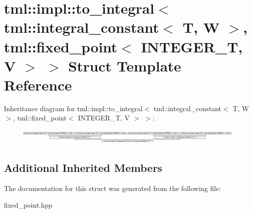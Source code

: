 \hypertarget{structtml_1_1impl_1_1to__integral_3_01tml_1_1integral__constant_3_01T_00_01W_01_4_00_01tml_1_1fi02608aa1375cbbb359f453a97b0813b7}{\section{tml\+:\+:impl\+:\+:to\+\_\+integral$<$ tml\+:\+:integral\+\_\+constant$<$ T, W $>$, tml\+:\+:fixed\+\_\+point$<$ I\+N\+T\+E\+G\+E\+R\+\_\+\+T, V $>$ $>$ Struct Template Reference}
\label{structtml_1_1impl_1_1to__integral_3_01tml_1_1integral__constant_3_01T_00_01W_01_4_00_01tml_1_1fi02608aa1375cbbb359f453a97b0813b7}
}
Inheritance diagram for tml\+:\+:impl\+:\+:to\+\_\+integral$<$ tml\+:\+:integral\+\_\+constant$<$ T, W $>$, tml\+:\+:fixed\+\_\+point$<$ I\+N\+T\+E\+G\+E\+R\+\_\+\+T, V $>$ $>$\+:\begin{figure}[H]
\begin{center}
\leavevmode
\includegraphics[height=0.773481cm]{structtml_1_1impl_1_1to__integral_3_01tml_1_1integral__constant_3_01T_00_01W_01_4_00_01tml_1_1fi02608aa1375cbbb359f453a97b0813b7}
\end{center}
\end{figure}
\subsection*{Additional Inherited Members}


The documentation for this struct was generated from the following file\+:\begin{DoxyCompactItemize}
\item 
fixed\+\_\+point.\+hpp\end{DoxyCompactItemize}
